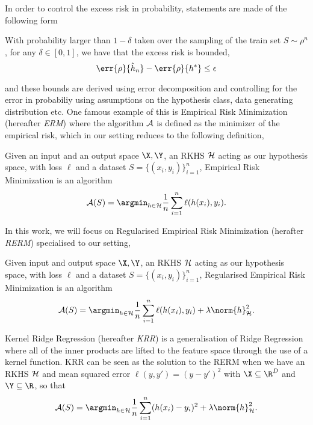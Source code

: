 In order to control the excess risk in probability, statements are made of the
following form
\begin{example}
  \label{ex:pac-like-excess-risk} With probability larger than \(1 - \delta\)
taken over the sampling of the train set \(S \sim \rho^n\), for any \(\delta \in
[0, 1]\), we have that the excess risk is bounded,
  \begin{equation*} \err{\rho}{\hat{h}_n} - \err{\rho}{h^{\ast}} \leq \epsilon
  \end{equation*}
\end{example} and these bounds are derived using error decomposition and
controlling for the error in probabiliy using assumptions on the hypothesis
class, data generating distribution etc. One famous example of this is Empirical
Risk Minimization (hereafter \emph{ERM})\cite{vapnik92_princ} where the
algorithm \(\mathcal{A}\) is defined as the minimizer of the empirical risk, which in
our setting reduces to the following definition,
\begin{definition}
  \label{def:erm} Given an input and an output space \(\X, \Y\), an RKHS
\(\mathcal{H}\) acting as our hypothesis space, with loss \(\ell\) and a dataset
\(S = \{(x_i, y_i)\}_{i=1}^n\), Empirical Risk Minimization is an algorithm
  \begin{equation} \algo(S) = \argmin_{h \in \mathcal{H}} \frac{1}{n}
\sum_{i=1}^n \ell(h(x_i), y_i).
  \end{equation}
\end{definition} In this work, we will focus on Regularised Empirical Risk
Minimization (herafter \emph{RERM}) specialised to our setting,
\begin{definition}
  \label{def:rerm} Given input and output space \(\X, \Y\), an RKHS \(\mathcal{H}\)
acting as our hypothesis space, with loss \(\ell\) and a dataset \(S = \{(x_i,
y_i)\}_{i=1}^n\), Regularised Empirical Risk Minimization is an algorithm
  \begin{equation} \algo(S) = \argmin_{h \in \mathcal{H}} \frac{1}{n}
\sum_{i=1}^n \ell(h(x_i), y_i) + \lambda \norm{h}_{\rkhs{H}}^2.
  \end{equation}
\end{definition}

Kernel Ridge Regression (hereafter \emph{KRR}) is a generalisation of Ridge
Regression \cite{hoerl70_ridge_regres} where all of the inner products are
lifted to the feature space through the use of a kernel function. KRR can be
seen as the solution to the RERM when we have an RKHS \(\mathcal{H}\) and mean
squared error \(\ell(y, y') = (y - y')^{2}\) with \(\X \subseteq \R^{D}\) and
\(\Y \subseteq \R\), so that
\begin{equation}
  \label{eq:krr-rerm-form} \algo(S) = \argmin_{h \in \mathcal{H}}
\frac{1}{n}\sum_{i=1}^n (h(x_i) - y_i)^2 + \lambda \norm{h}_{\rkhs{H}}^2.
\end{equation}


